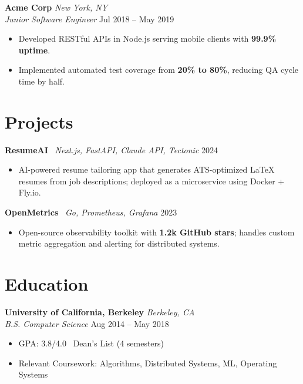 \documentclass[10pt, letterpaper]{article}
\newcommand{\jobentry}[4]{%
  \vspace{4pt}
  \textbf{#1} \hfill \textit{#3} \\
  \textit{#2} \hfill \small{#4}
  \vspace{1pt}
}
\newcommand{\projectentry}[3]{%
  \vspace{4pt}
  \textbf{#1} \textbar\ \textit{#2} \hfill \small{#3}
  \vspace{1pt}
}
\newcommand{\eduentry}[4]{%
  \vspace{4pt}
  \textbf{#1} \hfill \textit{#3} \\
  \textit{#2} \hfill \small{#4}
  \vspace{1pt}
}
\begin{document}
\jobentry{Acme Corp}{Junior Software Engineer}{New York, NY}{Jul 2018 -- May 2019}
\begin{itemize}
  \item Developed RESTful APIs in Node.js serving mobile clients with \textbf{99.9\% uptime}.
  \item Implemented automated test coverage from \textbf{20\% to 80\%}, reducing QA
        cycle time by half.
\end{itemize}
\section{Projects}

\projectentry{ResumeAI}{Next.js, FastAPI, Claude API, Tectonic}{2024}
\begin{itemize}
  \item AI-powered resume tailoring app that generates ATS-optimized LaTeX resumes
        from job descriptions; deployed as a microservice using Docker + Fly.io.
\end{itemize}

\projectentry{OpenMetrics}{Go, Prometheus, Grafana}{2023}
\begin{itemize}
  \item Open-source observability toolkit with \textbf{1.2k GitHub stars}; handles custom
        metric aggregation and alerting for distributed systems.
\end{itemize}
\section{Education}
\eduentry{University of California, Berkeley}{B.S. Computer Science}{Berkeley, CA}{Aug 2014 -- May 2018}
\begin{itemize}
  \item GPA: 3.8/4.0 \textbar\ Dean's List (4 semesters)
  \item Relevant Coursework: Algorithms, Distributed Systems, ML, Operating Systems
\end{itemize}
\end{document}
